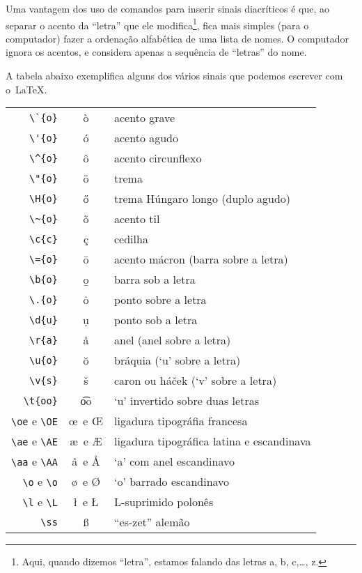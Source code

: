 \documentclass[article,openany]{memoir}
\newenvironment{exemplo}{\begin{center}}{\end{center}}
\begin{document}
Uma vantagem dos uso de comandos para inserir sinais diacríticos é
que, ao separar o acento da ``letra'' que ele modifica\footnote{Aqui,
  quando dizemos ``letra'', estamos falando das letras a, b, c,\ldots,
  z.}, fica mais simples (para o computador) fazer a ordenação
alfabética de uma lista de nomes. O computador ignora os acentos, e
considera apenas a sequência de ``letras'' do nome.

A tabela abaixo exemplifica alguns dos vários sinais que podemos
escrever com o~\LaTeX.
\begin{exemplo}
\begin{tabular}{rcl}
 \verb/\`{o}/ & \`{o} & acento grave                                   \\
 \verb/\'{o}/ & \'{o} & acento agudo                                   \\
 \verb/\^{o}/ & \^{o} & acento circunflexo                             \\
 \verb/\"{o}/ & \"{o} & trema                                          \\
 \verb/\H{o}/ & \H{o} & trema Húngaro longo (duplo agudo)              \\
 \verb/\~{o}/ & \~{o} & acento til                                     \\
 \verb/\c{c}/ & \c{c} & cedilha                                        \\
 \verb/\={o}/ & \={o} & acento mácron (barra sobre a letra)            \\
 \verb/\b{o}/ & \b{o} & barra sob a letra                              \\
 \verb/\.{o}/ & \.{o} & ponto sobre a letra                            \\
 \verb/\d{u}/ & \d{u} & ponto sob a letra                              \\
 \verb/\r{a}/ & \r{a} & anel (anel sobre a letra)                      \\
 \verb/\u{o}/ & \u{o} & bráquia (`u' sobre a letra)                    \\
 \verb/\v{s}/ & \v{s} & caron ou há\v cek (`v' sobre a letra)          \\
 \verb/\t{oo}/ 
              & \t{oo}     & `u' invertido sobre duas letras           \\
\verb/\oe/ e \verb/\OE/ 
              & \oe\ e \OE & ligadura tipográfia francesa              \\
\verb/\ae/ e \verb/\AE/
              & \ae\ e \AE & ligadura tipográfica latina e escandinava \\
\verb/\aa/ e \verb/\AA/ 
              & \aa\ e \AA & `a' com anel escandinavo                  \\
\verb/\o/ e \verb/\o/ 
              & \o\ e \O   & `o' barrado escandinavo                   \\
\verb/\l/ e \verb/\L/ 
              & \l\ e \L   & L-suprimido polonês                       \\
\verb/\ss/ & \ss           & ``es-zet'' alemão
\end{tabular}
\end{exemplo}
\end{document}
